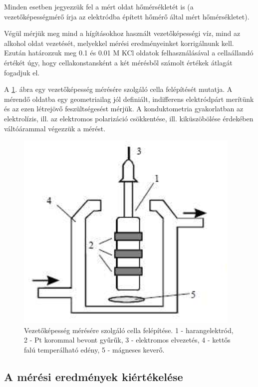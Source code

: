 Minden esetben jegyezzük fel a mért oldat hőmérsékletét is (a vezetőképességmérő írja az elektródba épített hőmérő által mért hőmérsékletet).

Végül mérjük meg mind a hígításokhoz használt vezetőképességi víz, mind az alkohol oldat vezetését, melyekkel mérési eredményeinket korrigálnunk kell.
Ezután határozzuk meg 0.1 és 0.01 M KCl oldatok felhasználásával a cellaállandó értékét úgy, hogy cellakonstansként a két mérésből számolt értékek átlagát fogadjuk el.

A \ref{fig:vez}. ábra egy vezetőképesség mérésére szolgáló cella felépítését mutatja.
A mérendő oldatba egy geometriailag jól definiált, indifferens elektródpárt merítünk és az ezen létrejövő feszültségesést mérjük.
A konduktometria gyakorlatban az elektrolízis, ill. az elektromos polarizáció csökkentése, ill. kiküszöbölése érdekében váltóárammal végezzük a mérést.

\begin{figure}
\centering
\includegraphics{cond.eps}
\caption{Vezetőképesség mérésére szolgáló cella felépítése. 1 - harangelektród, 2 - Pt korommal bevont gyűrűk, 3 - elektromos elvezetés, 4 - kettős falú temperálható edény, 5 - mágneses keverő.}
\label{fig:vez}
\end{figure}



\subsection{A mérési eredmények kiértékelése}

